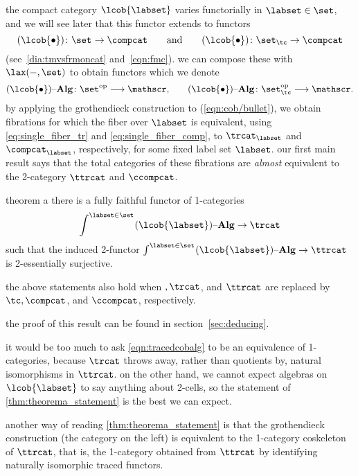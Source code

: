 \documentclass[11pt,oneside,article]{memoir}
\begin{document}
the compact category $\lcob{\labset}$ varies functorially in $\labset\in\set$, and we will see later
that this functor extends to functors
\begin{equation*}
   (\lcob{\bullet})\colon\set_{\tt}\to\compcat\qquad\tn{and}
   \qquad
   (\lcob{\bullet})\colon\set_{\tc}\to\compcat
\end{equation*}
(see~\eqref{dia:tmvsfrmoncat} and~\eqref{eqn:fmc}). we can compose these with $\lax(-,\set)$ to
obtain functors which we denote
\begin{equation}\label{eqn:cob/bullet}
   (\lcob{\bullet})\alg\colon\set_{\tt}^{\mathrm{op}}\too\cat,
   \qquad
   (\lcob{\bullet})\alg\colon\set_{\tc}^{\mathrm{op}}\too\cat.
\end{equation}
by applying the grothendieck construction to (\ref{eqn:cob/bullet}), we obtain fibrations for which
the fiber over $\labset$ is equivalent, using \eqref{eq:single_fiber_tr} and
\eqref{eq:single_fiber_comp}, to $\trcat_{\labset}$ and $\compcat_{\labset}$, respectively, for some
fixed label set $\labset$. our first main result says that the total categories of these fibrations
are \emph{almost} equivalent to the 2-category $\ttrcat$ and $\ccompcat$.

\begin{named}{theorem a}\label{thm:theorema_statement}
  there is a fully faithful functor of 1-categories
  \begin{equation}\label{eqn:tracedcobalg}
     \int^{\labset\in\set_{\tt}}(\lcob{\labset})\alg \to \trcat
  \end{equation}
  such that the induced 2-functor $\int^{\labset\in\set_{\tt}}(\lcob{\labset})\alg\to\ttrcat$ is
  2-essentially surjective.

  the above statements also hold when $\tt, \trcat$, and $\ttrcat$ are replaced by $\tc, \compcat$,
  and $\ccompcat$, respectively.
\end{named}

the proof of this result can be found in section~\ref{sec:deducing}.

\begin{remark}
   it would be too much to ask \eqref{eqn:tracedcobalg} to be an equivalence of 1-categories,
   because $\trcat$ throws away, rather than quotients by, natural isomorphisms in $\ttrcat$. on the
   other hand, we cannot expect algebras on $\lcob{\labset}$ to say anything about 2-cells, so the
   statement of \ref{thm:theorema_statement} is the best we can expect.

   another way of reading \ref{thm:theorema_statement} is that the grothendieck construction (the
   category on the left) is equivalent to the 1-category coskeleton of $\ttrcat$, that is, the
   1-category obtained from $\ttrcat$ by identifying naturally isomorphic traced functors.
\end{remark}
\end{document}
